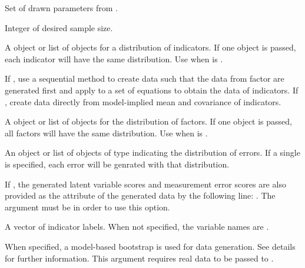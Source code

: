\documentclass[a4paper]{book}
\begin{document}
\begin{Arguments}
\begin{ldescription}
\item[\code{paramSet}] 
Set of drawn parameters from .

\item[\code{n}] 
Integer of desired sample size.

\item[\code{indDist}] 
A  object or list of objects for a distribution of indicators. If one object is passed, each indicator will have the same distribution. Use when  is .

\item[\code{sequential}] 
If , use a sequential method to create data such that the data from factor are generated first and apply to a set of equations to obtain the data of indicators. If , create data directly from model-implied mean and covariance of indicators.

\item[\code{facDist}] 
A  object or list of objects for the distribution of factors. If one object is passed, all factors will have the same distribution. Use when  is .

\item[\code{errorDist}] 
An object or list of objects of type  indicating the distribution of errors. If a single  is specified, each error will be genrated with that distribution.

\item[\code{saveLatentVar}]  
If , the generated latent variable scores and measurement error scores are also provided as the  attribute of the generated data by the following line: . The  argument must be  in order to use this option.

\item[\code{indLab}] 
A vector of indicator labels. When not specified, the variable names are .

\item[\code{modelBoot}] 
When specified, a model-based bootstrap is used for data generation. See details for further information. This argument requires real data to be passed to .


\end{ldescription}
\end{Arguments}
\end{document}
